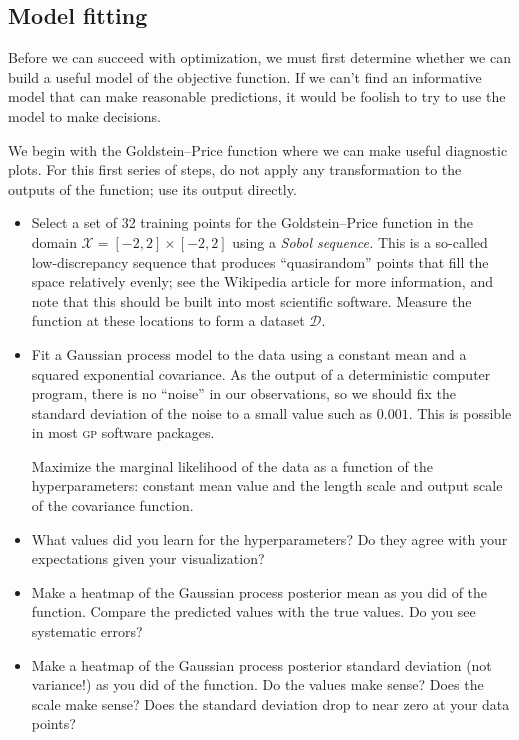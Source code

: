 \documentclass{article}
\newcommand{\acro}[1]{\textsc{\MakeLowercase{#1}}}
\newcommand{\mc}[1]{\mathcal{#1}}
\newcommand{\data}{\mc{D}}
\begin{document}
\subsection*{Model fitting}

Before we can succeed with optimization, we must first determine whether we can
build a useful model of the objective function. If we can't find an informative
model that can make reasonable predictions, it would be foolish to try to use
the model to make decisions.

We begin with the Goldstein--Price function where we can make useful diagnostic plots. For
this first series of steps, do not apply any transformation to the outputs of
the function; use its output directly.

\begin{itemize}
\item
  Select a set of 32 training points for the Goldstein--Price function in the domain
  $\mc{X} = [-2, 2] \times [-2, 2]$ using a \emph{Sobol sequence.} This is a
  so-called low-discrepancy sequence that produces ``quasirandom'' points that
  fill the space relatively evenly; see the Wikipedia article for more
  information, and note that this should be built into most scientific
  software. Measure the function at these locations to form a dataset $\data$.
\item
  Fit a Gaussian process model to the data using a constant mean and a squared
  exponential covariance. As the output of a deterministic computer program,
  there is no ``noise'' in our observations, so we should fix the standard
  deviation of the noise to a small value such as $0.001$. This is possible in
  most \acro{GP} software packages.

  Maximize the marginal likelihood of the data as a function of the
  hyperparameters: constant mean value and the length scale and output scale of
  the covariance function.
\item
  What values did you learn for the hyperparameters? Do they agree with your
  expectations given your visualization?
\item
  Make a heatmap of the Gaussian process posterior mean as you did of the
  function. Compare the predicted values with the true values.  Do you see
  systematic errors?
\item
  Make a heatmap of the Gaussian process posterior standard deviation (not
  variance!) as you did of the function. Do the values make sense? Does the
  scale make sense? Does the standard deviation drop to near zero at your data
  points?


\end{itemize}
\end{document}
